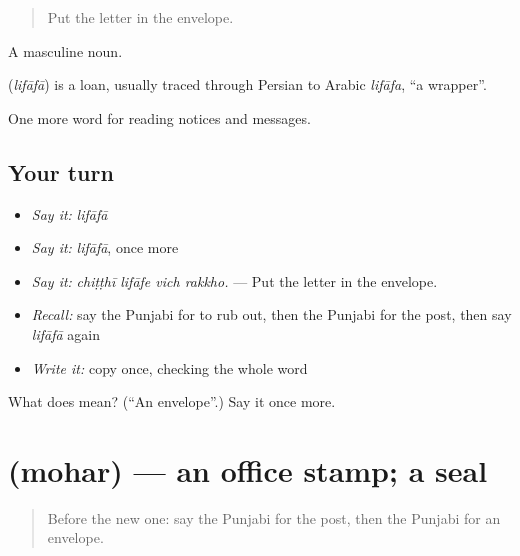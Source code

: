\begin{quote}
Put the letter in the envelope.
\end{quote}

A masculine noun.

\begin{cousinweb}
\textbf{} (\emph{lifāfā}) is a loan, usually traced through Persian to Arabic \emph{lifāfa}, \textquotedblleft{}a wrapper\textquotedblright{}.
\end{cousinweb}

\begin{grammarlens}[title={What you've built}]
One more word for reading notices and messages.
\end{grammarlens}

\subsection*{Your turn}
\begin{itemize}
\raggedright
  \item \emph{Say it:} \emph{lifāfā}
  \item \emph{Say it:} \emph{lifāfā}, once more
  \item \emph{Say it:} \emph{chiṭṭhī lifāfe vich rakkho.} — Put the letter in the envelope.
  \item \emph{Recall:} say the Punjabi for to rub out, then the Punjabi for the post, then say \emph{lifāfā} again
  \item \emph{Write it:} copy \textbf{} once, checking the whole word
\end{itemize}

\begin{tcolorbox}[breakable,colback=teal!4,colframe=teal!35!black,title={Before you move on}]
What does  mean? (\textquotedblleft{}An envelope\textquotedblright{}.) Say it once more.
\end{tcolorbox}
\section[\texorpdfstring{\pa{ਮੋਹਰ} (mohar)}{ਮੋਹਰ (mohar)}]{ (mohar) — an office stamp; a seal}

\label{lesson:PA-C255-mohar}



\begin{quote}
Before the new one: say the Punjabi for the post, then the Punjabi for an envelope.
\end{quote}

